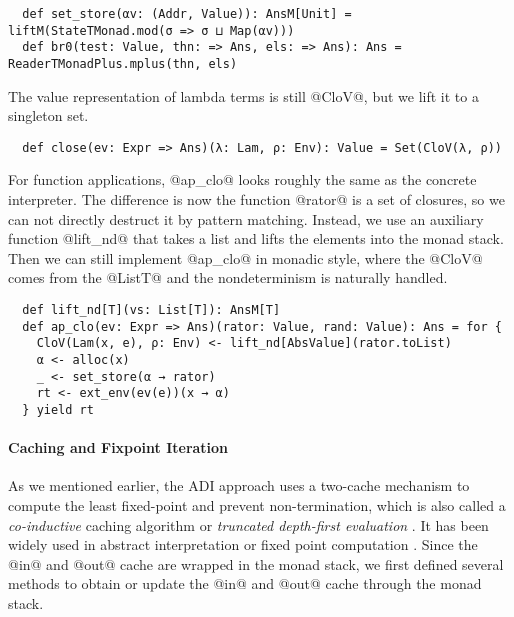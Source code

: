 \begin{lstlisting}
  def set_store(αv: (Addr, Value)): AnsM[Unit] = liftM(StateTMonad.mod(σ => σ ⊔ Map(αv)))
  def br0(test: Value, thn: => Ans, els: => Ans): Ans = ReaderTMonadPlus.mplus(thn, els)
\end{lstlisting}

The value representation of lambda terms is still @CloV@, but we lift it to a
singleton set.

\begin{lstlisting}
  def close(ev: Expr => Ans)(λ: Lam, ρ: Env): Value = Set(CloV(λ, ρ))
\end{lstlisting}

For function applications, @ap_clo@ looks roughly the same as the concrete
interpreter. The difference is now the function @rator@ is a set of closures, so
we can not directly destruct it by pattern matching. Instead, we use an
auxiliary function @lift_nd@ that takes a list and lifts the elements into the
monad stack. Then we can still implement @ap_clo@ in monadic style, where the
@CloV@ comes from the @ListT@ and the nondeterminism is naturally handled.

\begin{lstlisting}
  def lift_nd[T](vs: List[T]): AnsM[T]
  def ap_clo(ev: Expr => Ans)(rator: Value, rand: Value): Ans = for {
    CloV(Lam(x, e), ρ: Env) <- lift_nd[AbsValue](rator.toList)
    α <- alloc(x)
    _ <- set_store(α → rator)
    rt <- ext_env(ev(e))(x → α)
  } yield rt
\end{lstlisting}


\paragraph{Caching and Fixpoint Iteration}

As we mentioned earlier, the ADI approach uses a two-cache mechanism to
compute the least fixed-point and prevent non-termination, which is also called a
\textit{co-inductive} caching algorithm or \textit{truncated depth-first
evaluation} \cite{Rosendahl:AbsIntPL}. It has been widely used in abstract
interpretation or fixed point computation
\cite{DBLP:journals/pacmpl/DaraisLNH17, Wei:2018:RAA:3243631.3236800,
Rosendahl:AbsIntPL}. Since the @in@ and @out@ cache are wrapped in the monad
stack, we first defined several methods to obtain or update the @in@ and @out@
cache through the monad stack.

